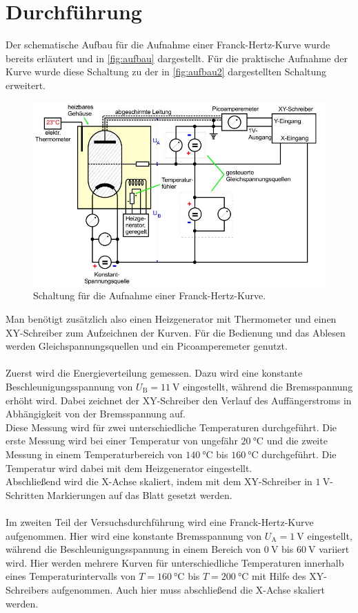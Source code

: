 \section{Durchführung}
\label{sec:Durchführung}
Der schematische Aufbau für die Aufnahme einer Franck-Hertz-Kurve wurde bereits erläutert und in \autoref{fig:aufbau} dargestellt. Für die praktische Aufnahme der Kurve wurde diese Schaltung zu der in \autoref{fig:aufbau2} dargestellten Schaltung erweitert. 
\begin{figure}[H]
    \centering
    \includegraphics[width=\textwidth]{images/aufbau2.JPG}
    \caption{Schaltung für die Aufnahme einer Franck-Hertz-Kurve. \cite{V601}}
    \label{fig:aufbau2}
  \end{figure}
\noindent
Man benötigt zusätzlich also einen Heizgenerator mit Thermometer und einen XY-Schreiber zum Aufzeichnen der Kurven. Für die Bedienung und das Ablesen werden Gleichspannungsquellen und ein Picoamperemeter genutzt.\\
\\
Zuerst wird die Energieverteilung gemessen. Dazu wird eine konstante Beschleunigungsspannung von $U_\text{B} = \SI{11}{\volt}$ eingestellt, während 
die Bremsspannung erhöht wird.
Dabei zeichnet der XY-Schreiber den Verlauf des Auffängerstroms in Abhängigkeit von der Bremsspannung auf.\\
Diese Messung wird für zwei unterschiedliche Temperaturen durchgeführt. Die erste Messung wird bei einer Temperatur von ungefähr $\SI{20}{\celsius}$
und die zweite Messung in einem Temperaturbereich von $\SI{140}{\celsius}$ bis $\SI{160}{\celsius}$ durchgeführt. Die Temperatur wird dabei mit dem Heizgenerator eingestellt.\\
Abschließend wird die X-Achse skaliert, indem mit dem XY-Schreiber in $\SI{1}{\volt}$-Schritten Markierungen auf das Blatt gesetzt werden.\\ 
\\
Im zweiten Teil der Versuchsdurchführung wird eine Franck-Hertz-Kurve aufgenommen. Hier wird eine konstante Bremsspannung von $U_\text{A} = \SI{1}{\volt}$ eingestellt, während die Beschleunigungsspannung in einem Bereich von $\SI{0}{\volt}$ bis $\SI{60}{\volt}$ variiert wird. Hier werden mehrere Kurven für unterschiedliche Temperaturen innerhalb eines Temperaturintervalls von $T = \SI{160}{\celsius}$ bis $T=\SI{200}{\celsius}$ mit Hilfe des XY-Schreibers aufgenommen. Auch hier muss abschließend die X-Achse skaliert werden.